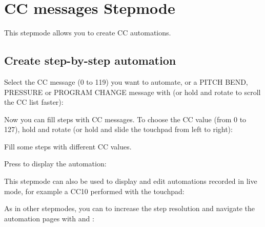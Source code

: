 \section{CC messages Stepmode}

This stepmode allows you to create CC automations.

\subsection{Create step-by-step automation}

Select the CC message (0 to 119) you want to automate, or a PITCH BEND, PRESSURE or PROGRAM CHANGE message with \encodericon{} (or hold  and rotate \encodericon{} to scroll the CC list faster):



Now you can fill steps with CC messages. To choose the CC value (from 0 to 127), hold  and rotate \encodericon{} (or hold  and slide the touchpad from left to right):



Fill some steps with different CC values.

Press  to display the automation:




This stepmode can also be used to display and edit automations recorded in live mode, for example a CC10 performed with the touchpad:



As in other stepmodes, you can  to increase the step resolution and navigate the automation pages with \btn{<} and \btn{>}:

